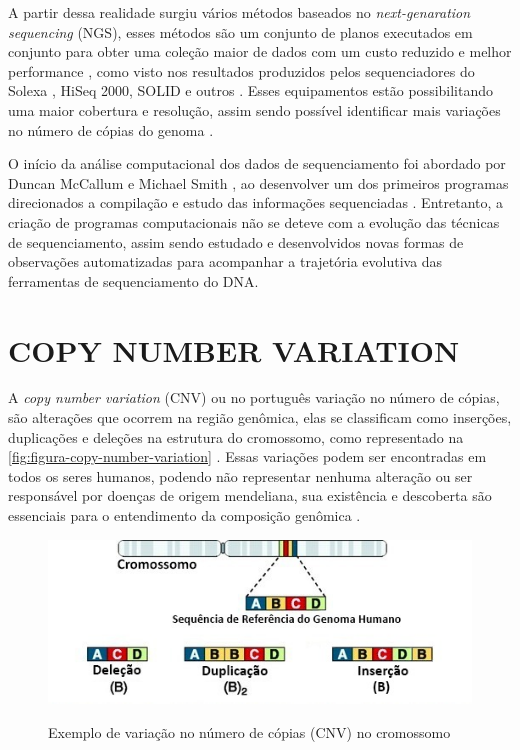 A partir dessa realidade surgiu vários métodos baseados no \textit{next-genaration sequencing} (NGS), esses métodos são um conjunto de planos executados em conjunto para obter uma coleção maior de dados com um custo reduzido e melhor performance \cite{Metzker2010,Zhao2013}, como visto nos resultados produzidos pelos sequenciadores do Solexa \cite{Bennett2004}, HiSeq 2000, SOLID e outros \cite{Edwards2011,Linnarsson2010}. Esses equipamentos estão possibilitando uma maior cobertura e resolução, assim sendo possível identificar mais variações no número de cópias do genoma \cite{Zhao2013}. 


O início da análise computacional dos dados de sequenciamento foi abordado por Duncan McCallum e Michael Smith \cite{McCallum1977}, ao desenvolver um dos primeiros programas direcionados a compilação e estudo das informações sequenciadas \cite{HutchisonIII2007}. Entretanto, a criação de programas computacionais não se deteve com a evolução das técnicas de sequenciamento, assim sendo estudado e desenvolvidos novas formas de observações automatizadas para acompanhar a trajetória evolutiva das ferramentas de sequenciamento do DNA. 


\section{COPY NUMBER VARIATION} 

A \textit{copy number variation} (CNV) ou no português variação no número de cópias, são alterações que ocorrem na região genômica, elas se classificam como inserções, duplicações e deleções na estrutura do cromossomo, como representado na \autoref{fig:figura-copy-number-variation} \cite{Zhao2013,Redon2006}. Essas variações podem ser encontradas em todos os seres humanos, podendo não representar nenhuma alteração ou ser responsável por doenças de origem mendeliana, sua existência e descoberta são essenciais para o entendimento da composição genômica \cite{Redon2006,Feuk2006}.

\begin{figure}[!htb]
    \centering
    \caption{Exemplo de variação no número de cópias (CNV) no cromossomo}
    \includegraphics[width=1\textwidth]{./dados/figuras/copy-number-variation}
    \label{fig:figura-copy-number-variation}
\end{figure}


